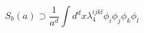 \begin{equation}
S_b(a) \supset \frac 1 {a^{d}} \int d^dx
\lambda_4^{ijkl}\phi_i\phi_j\phi_k\phi_l
\end{equation}

